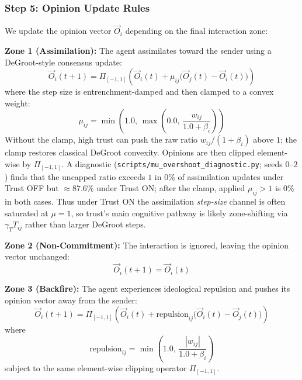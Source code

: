 \subsubsection{Step 5: Opinion Update Rules}
We update the opinion vector $\vec{O}_i$ depending on the final interaction zone:
\begin{itemize*}
    \item \textbf{Zone 1 (Assimilation):} The agent assimilates toward the sender using a DeGroot-style consensus update:
    \begin{equation}
        \vec{O}_i(t+1) = \Pi_{[-1, 1]}\left(\vec{O}_i(t) + \mu_{ij} \Big(\vec{O}_j(t) - \vec{O}_i(t)\Big)\right)
    \end{equation}
    where the step size is entrenchment-damped and then clamped to a convex weight:
    \begin{equation}
        \mu_{ij} = \min\left(1.0,\, \max\left(0.0,\, \frac{w_{ij}}{1.0 + \beta_i}\right)\right)
    \end{equation}
    Without the clamp, high trust can push the raw ratio $w_{ij}/(1+\beta_i)$ above $1$; the clamp restores classical DeGroot convexity. Opinions are then clipped element-wise by $\Pi_{[-1,1]}$. A diagnostic (\texttt{scripts/mu\_overshoot\_diagnostic.py}; seeds $0$--$2$) finds that the uncapped ratio exceeds $1$ in $0\%$ of assimilation updates under Trust OFF but $\approx 87.6\%$ under Trust ON; after the clamp, applied $\mu_{ij}>1$ is $0\%$ in both cases. Thus under Trust ON the assimilation \emph{step-size} channel is often saturated at $\mu=1$, so trust's main cognitive pathway is likely zone-shifting via $\gamma_T T_{ij}$ rather than larger DeGroot steps.
    
    \item \textbf{Zone 2 (Non-Commitment):} The interaction is ignored, leaving the opinion vector unchanged:
    \begin{equation}
        \vec{O}_i(t+1) = \vec{O}_i(t)
    \end{equation}
    
    \item \textbf{Zone 3 (Backfire):} The agent experiences ideological repulsion and pushes its opinion vector away from the sender:
    \begin{equation}
        \vec{O}_i(t+1) = \Pi_{[-1, 1]}\left(\vec{O}_i(t) + \text{repulsion}_{ij} \Big(\vec{O}_i(t) - \vec{O}_j(t)\Big)\right)
    \end{equation}
    where
    \begin{equation}
        \text{repulsion}_{ij} = \min\left(1.0,\, \frac{|w_{ij}|}{1.0 + \beta_i}\right)
    \end{equation}
    subject to the same element-wise clipping operator $\Pi_{[-1, 1]}$.
\end{itemize*}


